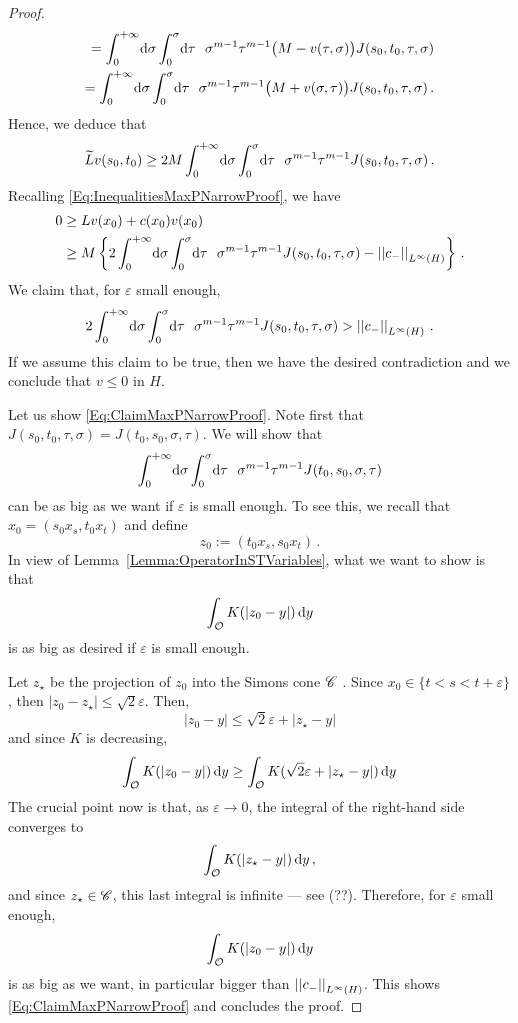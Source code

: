 \begin{proof}
\begin{align*}
	=  \int_0^{+\infty}  \!\! \d \sigma \int_0^{\sigma}  \!\! \d \tau \ \ \sigma^{m-1} \tau^{m-1} \big(M - v(\tau, \sigma)\big) J(s_0,t_0,\tau, \sigma)   \\
	=  \int_0^{+\infty}  \!\! \d \sigma \int_0^{\sigma}  \!\! \d \tau \ \ \sigma^{m-1} \tau^{m-1} \big(M + v(\sigma, \tau)\big) J(s_0,t_0,\tau, \sigma) \,.   \\
	\end{align*}
	Hence, we deduce that
	$$
	\widetilde{L} v (s_0,t_0) \geq 2M \int_0^{+\infty}  \!\! \d \sigma \int_0^{\sigma}  \!\! \d \tau \ \ \sigma^{m-1} \tau^{m-1} J(s_0,t_0,\tau, \sigma)\,.
	$$
	Recalling \eqref{Eq:InequalitiesMaxPNarrowProof}, we have
	\begin{align*}
	0& \geq L v(x_0) + c(x_0)v(x_0)  \\
	& \geq M \left\{ 2 \int_0^{+\infty}  \!\! \,\mathrm{d} \sigma \int_0^{\sigma}  \!\! \,\mathrm{d} \tau \ \ \sigma^{m-1} \tau^{m-1} J(s_0,t_0,\tau, \sigma) - \left | \left |{c_-} \right | \right |_{L^\infty(H)}
	\right\}\,.
	\end{align*}
	We claim that, for $\varepsilon$ small enough,
	\begin{equation}
	\label{Eq:ClaimMaxPNarrowProof}
	2 \int_0^{+\infty}  \!\! \d \sigma \int_0^{\sigma}  \!\! \d \tau \ \ \sigma^{m-1} \tau^{m-1} J(s_0,t_0,\tau, \sigma) > \norm{c_-}_{L^\infty(H)}\,.
	\end{equation}
	If we assume this claim to be true, then we have the desired contradiction and we conclude that $v \leq 0$ in $H$.
	
	Let us show \eqref{Eq:ClaimMaxPNarrowProof}. Note first that $J(s_0, t_0, \tau, \sigma) = J(t_0, s_0, \sigma, \tau)$. We will show that
	$$
	\int_0^{+\infty}  \!\! \,\mathrm{d} \sigma \int_0^{\sigma}  \!\! \,\mathrm{d} \tau \ \ \sigma^{m-1} \tau^{m-1} J(t_0, s_0, \sigma, \tau)
	$$
	can be as big as we want if $\varepsilon$ is small enough. To see this, we recall that $x_0 = (s_0 x_s, t_0 x_t)$ and define 
	$$
	z_0 := (t_0 x_s,  s_0 x_t)\,.
	$$
	In view of Lemma~\ref{Lemma:OperatorInSTVariables}, what we want to show is that
	$$
	\int_{\mathcal{O}} K(|z_0 - y|)\,\mathrm{d} y
	$$
	is as big as desired if $\varepsilon$ is small enough. 
	
	Let $z_\star$ be the projection of $z_0$ into the Simons cone $\mathscr{C}$ . Since $x_0 \in \{t < s < t + \varepsilon\}$, then $|z_0 - z_\star| \leq \sqrt{2}\varepsilon$. 
	Then,
	$$
	|z_0 - y| \leq \sqrt{2}\varepsilon + |z_\star - y|
	$$
	and since $K$ is decreasing,
	$$
	\int_{\mathcal{O}} K(|z_0 - y|)\,\mathrm{d} y \geq
	\int_{\mathcal{O}} K(\sqrt{2}\varepsilon + |z_\star - y|)\,\mathrm{d} y
	$$
	The crucial point now is that, as $\varepsilon \to 0$, the integral of the right-hand side converges to 
	$$
	\int_{\mathcal{O}} K(|z_\star - y|)\,\mathrm{d} y\,,
	$$
	and since $z_\star \in \mathscr{C}$, this last integral is infinite --- see (??). Therefore, for $\varepsilon$ small enough,  
	$$
	\int_{\mathcal{O}} K(|z_0 - y|)\,\mathrm{d} y
	$$
	is as big as we want, in particular bigger than $\left | \left |{c_-} \right | \right |_{L^\infty(H)}$. This shows \eqref{Eq:ClaimMaxPNarrowProof} and concludes the proof.
\end{proof}

